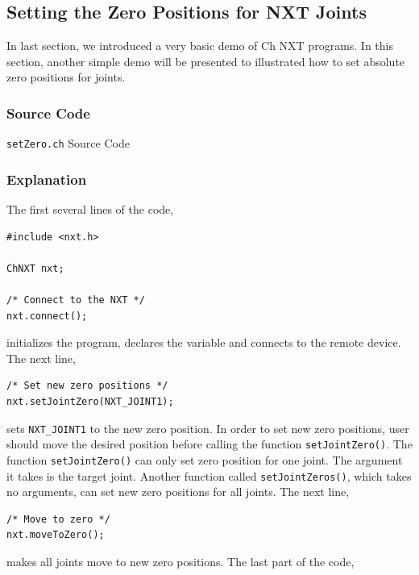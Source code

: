 \documentclass[11pt]{article}
\begin{document}
\subsection{\label{sec:setzero_demo}Setting the Zero Positions for NXT Joints}
In last section, we introduced a very basic demo of Ch NXT programs. In this section, another simple demo
will be presented to illustrated how to set absolute zero positions for joints.

\subsubsection*{Source Code}
\begin{Program}[H]
    {\small}
    \caption{\texttt{setZero.ch} Source Code\label{prog_setZero.ch}}
\end{Program}

\subsubsection*{Explanation}
The first several lines of the code,\\

\begin{verbatim}
#include <nxt.h>

ChNXT nxt;

/* Connect to the NXT */
nxt.connect();
\end{verbatim}

initializes the program, declares the variable and connects to the remote device. The next line,

\begin{verbatim}
/* Set new zero positions */
nxt.setJointZero(NXT_JOINT1);
\end{verbatim}

sets \texttt{NXT\_JOINT1} to the new zero position. In order to set new zero positions, user should 
move the desired position before calling the function \texttt{setJointZero()}. The function \texttt{setJointZero()} 
can only set zero position for one joint. The argument it takes is the target joint. Another function called 
\texttt{setJointZeros()}, which takes no arguments, can set new zero positions for all joints. The next line,

\begin{verbatim}
/* Move to zero */
nxt.moveToZero();
\end{verbatim}

makes all joints move to new zero positions. The last part of the code,
\end{document}
